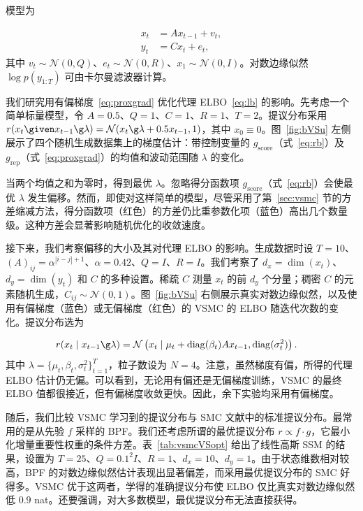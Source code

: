 模型为

\begin{align*}
x_t &= A x_{t-1} +v_t, \\
y_t &= C x_t+e_t,
\end{align*}
其中 $v_t\sim\mathcal N(0,Q)$、$e_t\sim\mathcal N(0,R)$、$x_1\sim\mathcal N(0,I)$。对数边缘似然 $\log p(y_{1:T})$ 可由卡尔曼滤波器计算。

我们研究用有偏梯度~\eqref{eq:proxgrad} 优化代理 ELBO~\eqref{eq:lb} 的影响。先考虑一个简单标量模型，令 $A=0.5$、$Q=1$、$C=1$、$R=1$、$T=2$。提议分布采用 $r(x_t\given x_{t-1}\g\lambda)=\mathcal N(x_t\g\lambda+0.5x_{t-1},1)$，其中 $x_0\equiv0$。图~\ref{fig:bVSu} 左侧展示了四个随机生成数据集上的梯度估计：带控制变量的 $g_{\text{score}}$（式~\eqref{eq:rb}）及 $g_{\text{rep}}$（式~\eqref{eq:proxgrad}）的均值和波动范围随 $\lambda$ 的变化。

当两个均值之和为零时，得到最优 $\lambda$。忽略得分函数项 $g_{\text{score}}$（式~\eqref{eq:rb}）会使最优 $\lambda$ 发生偏移。然而，即使对这样简单的模型，尽管采用了第~\ref{sec:vsmc} 节的方差缩减方法，得分函数项（红色）的方差仍比重参数化项（蓝色）高出几个数量级。这种方差会显著影响随机优化的收敛速度。

接下来，我们考察偏移的大小及其对代理 ELBO 的影响。生成数据时设 $T=10$、$(A)_{ij}=\alpha^{|i-j|+1}$、$\alpha=0.42$、$Q=I$、$R=I$。我们考察了 $d_x=\dim(x_t)$、$d_y=\dim(y_t)$ 和 $C$ 的多种设置。稀疏 $C$ 测量 $x_t$ 的前 $d_y$ 个分量；稠密 $C$ 的元素随机生成，$C_{ij}\sim\mathcal N(0,1)$。图~\ref{fig:bVSu} 右侧展示真实对数边缘似然，以及使用有偏梯度（蓝色）或无偏梯度（红色）的 VSMC 的 ELBO 随迭代次数的变化。提议分布选为

\begin{align*}
r(x_t\mid x_{t-1}\g\lambda) &= \mathcal{N}\left(x_t\mid \mu_t + 
\operatorname{diag}(\beta_t) A x_{t-1}, 
\operatorname{diag}(\sigma_t^2)\right).
\end{align*}
其中 $\lambda=\{\mu_t,\beta_t,\sigma_t^2\}_{t=1}^T$，粒子数设为 $N=4$。注意，虽然梯度有偏，所得的代理 ELBO 估计仍无偏。可以看到，无论用有偏还是无偏梯度训练，VSMC 的最终 ELBO 值都很接近，但有偏梯度收敛更快。因此，余下实验均采用有偏梯度。

随后，我们比较 VSMC 学习到的提议分布与 SMC 文献中的标准提议分布。最常用的是从先验 $f$ 采样的 BPF。我们还考虑所谓的最优提议分布 $r\propto f\cdot g$，它最小化增量重要性权重的条件方差\citep{doucet2009tutorial}。表~\ref{tab:vsmcVSopt} 给出了线性高斯 SSM 的结果，设置为 $T=25$、$Q=0.1^2I$、$R=1$、$d_x=10$、$d_y=1$。由于状态维数相对较高，BPF 的对数边缘似然估计表现出显著偏差，而采用最优提议分布的 SMC 好得多。VSMC 优于这两者，学得的准确提议分布使 ELBO 仅比真实对数边缘似然低 $0.9$ nat。还要强调，对大多数模型，最优提议分布无法直接获得。

